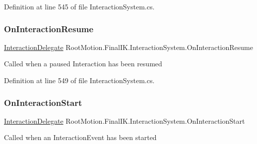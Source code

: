 Definition at line 545 of file Interaction\+System.\+cs.

\mbox{\label{class_root_motion_1_1_final_i_k_1_1_interaction_system_a2310c0a686686871aebdce9e8a2cc425}} 
\subsubsection{\texorpdfstring{On\+Interaction\+Resume}{OnInteractionResume}}
{\footnotesize\ttfamily \mbox{\hyperlink{class_root_motion_1_1_final_i_k_1_1_interaction_system_aa5a8c5136773b4244ab8f7ce707620b7}{Interaction\+Delegate}} Root\+Motion.\+Final\+I\+K.\+Interaction\+System.\+On\+Interaction\+Resume}



Called when a paused Interaction has been resumed 



Definition at line 549 of file Interaction\+System.\+cs.

\mbox{\label{class_root_motion_1_1_final_i_k_1_1_interaction_system_af45e914f48faf63e66e276a88085ac57}} 
\subsubsection{\texorpdfstring{On\+Interaction\+Start}{OnInteractionStart}}
{\footnotesize\ttfamily \mbox{\hyperlink{class_root_motion_1_1_final_i_k_1_1_interaction_system_aa5a8c5136773b4244ab8f7ce707620b7}{Interaction\+Delegate}} Root\+Motion.\+Final\+I\+K.\+Interaction\+System.\+On\+Interaction\+Start}



Called when an Interaction\+Event has been started 



